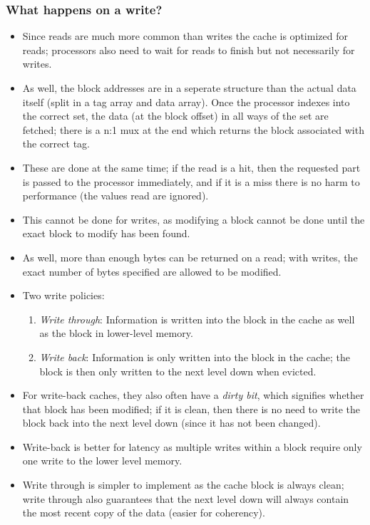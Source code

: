 \subsubsection{What happens on a write?}
\begin{itemize}
  \item Since reads are much more common than writes the cache is optimized for reads; processors also need to wait for reads to finish but not necessarily for writes.
  \item As well, the block addresses are in a seperate structure than the actual data itself (split in a tag array and data array). Once the processor indexes into the correct set, the data (at the block offset) in all ways of the set are fetched; there is a n:1 mux at the end which returns the block associated with the correct tag.
  \item These are done at the same time; if the read is a hit, then the requested part is passed to the processor immediately, and if it is a miss there is no harm to performance (the values read are ignored).
  \item This cannot be done for writes, as modifying a block cannot be done until the exact block to modify has been found.
  \item As well, more than enough bytes can be returned on a read; with writes, the exact number of bytes specified are allowed to be modified.
  \item Two write policies:
  \begin{enumerate}
    \item \textit{Write through}: Information is written into the block in the cache as well as the block in lower-level memory.
    \item \textit{Write back}: Information is only written into the block in the cache; the block is then only written to the next level down when evicted.
  \end{enumerate}
  \item For write-back caches, they also often have a \textit{dirty bit}, which signifies whether that block has been modified; if it is clean, then there is no need to write the block back into the next level down (since it has not been changed).
  \item Write-back is better for latency as multiple writes within a block require only one write to the lower level memory.
  \item Write through is simpler to implement as the cache block is always clean; write through also guarantees that the next level down will always contain the most recent copy of the data (easier for coherency).

\end{itemize}
